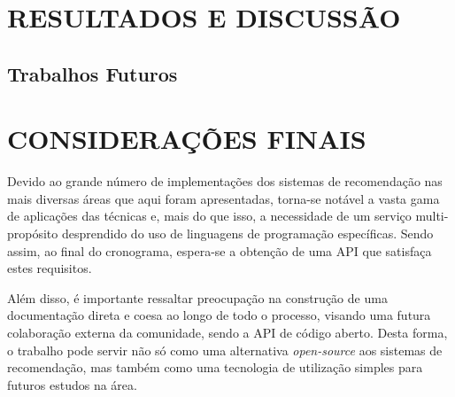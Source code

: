 \documentclass[12pt, openright, oneside, a4paper, brazil]{abntex2}
\begin{document}
%
%

\chapter{RESULTADOS E DISCUSSÃO}

\section{Trabalhos Futuros} \label{trabalhos_futuros}

\chapter{CONSIDERAÇÕES FINAIS}

Devido ao grande número de implementações dos sistemas de recomendação nas mais diversas áreas que aqui foram apresentadas, torna-se notável a vasta gama de aplicações das técnicas e, mais do que isso, a necessidade de um serviço multi-propósito desprendido do uso de linguagens de programação específicas. Sendo assim, ao final do cronograma, espera-se a obtenção de uma API que satisfaça estes requisitos.

Além disso, é importante ressaltar preocupação na construção de uma documentação direta e coesa ao longo de todo o processo, visando uma futura colaboração externa da comunidade, sendo a API de código aberto. Desta forma, o trabalho pode servir não só como uma alternativa \textit{open-source} aos sistemas de recomendação, mas também como uma tecnologia de utilização simples para futuros estudos na área.

\postextual

\end{document}

